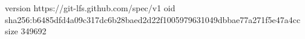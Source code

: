 version https://git-lfs.github.com/spec/v1
oid sha256:b6485dfd4a09c317dc6b28baed2d22f1005979631049dbbae77a271f5e47a4cc
size 349692
